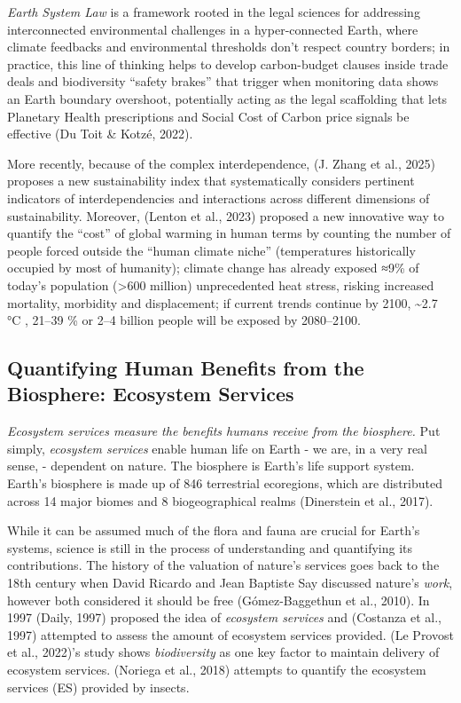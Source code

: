 \documentclass[
  12pt,
  letterpaper,
  DIV=11,
  numbers=noendperiod]{scrartcl}
\begin{document}
\emph{Earth System Law} is a framework rooted in the legal sciences for
addressing interconnected environmental challenges in a hyper-connected
Earth, where climate feedbacks and environmental thresholds don't
respect country borders; in practice, this line of thinking helps to
develop carbon-budget clauses inside trade deals and biodiversity
``safety brakes'' that trigger when monitoring data shows an Earth
boundary overshoot, potentially acting as the legal scaffolding that
lets Planetary Health prescriptions and Social Cost of Carbon price
signals be effective (Du Toit \& Kotzé, 2022).

More recently, because of the complex interdependence, (J. Zhang et al.,
2025) proposes a new sustainability index that systematically considers
pertinent indicators of interdependencies and interactions across
different dimensions of sustainability. Moreover, (Lenton et al., 2023)
proposed a new innovative way to quantify the ``cost'' of global warming
in human terms by counting the number of people forced outside the
``human climate niche'' (temperatures historically occupied by most of
humanity); climate change has already exposed ≈9\% of today's population
(\textgreater600 million) unprecedented heat stress, risking increased
mortality, morbidity and displacement; if current trends continue by
2100, \textasciitilde2.7 °C , 21--39 \% or 2--4 billion people will be
exposed by 2080--2100.

\subsection{Quantifying Human Benefits from the Biosphere: Ecosystem
Services}\label{quantifying-human-benefits-from-the-biosphere-ecosystem-services}

\emph{Ecosystem services measure the benefits humans receive from the
biosphere.} Put simply, \emph{ecosystem services} enable human life on
Earth - we are, in a very real sense, - dependent on nature. The
biosphere is Earth's life support system. Earth's biosphere is made up
of 846 terrestrial ecoregions, which are distributed across 14 major
biomes and 8 biogeographical realms (Dinerstein et al., 2017).

While it can be assumed much of the flora and fauna are crucial for
Earth's systems, science is still in the process of understanding and
quantifying its contributions. The history of the valuation of nature's
services goes back to the 18th century when David Ricardo and Jean
Baptiste Say discussed nature's \emph{work}, however both considered it
should be free (Gómez-Baggethun et al., 2010). In 1997 (Daily, 1997)
proposed the idea of \emph{ecosystem services} and (Costanza et al.,
1997) attempted to assess the amount of ecosystem services provided. (Le
Provost et al., 2022)'s study shows \emph{biodiversity} as one key
factor to maintain delivery of ecosystem services. (Noriega et al.,
2018) attempts to quantify the ecosystem services (ES) provided by
insects.
\end{document}
